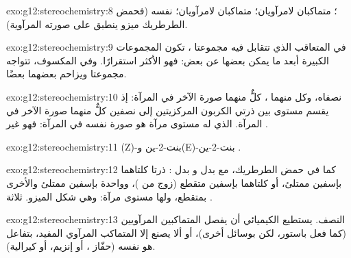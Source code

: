 \begin{solution}{exo:g12:stereochemistry:8}
؛ متماكبان لامرآويان؛ متماكبان لامرآويان؛  نفسه (فحمض الطرطريك
ميزو ينطبق على صورته المرآوية).
\end{solution}

\begin{solution}{exo:g12:stereochemistry:9}
في  المتعاقب الذي تتقابل فيه مجموعتا ، تكون المجموعات
الكبيرة أبعد ما يمكن بعضها عن بعض: فهو الأكثر استقرارًا. وفي
 المكسوف، تتواجه مجموعتا  ويزاحم بعضهما بعضًا.
\end{solution}

\begin{solution}{exo:g12:stereochemistry:10}
نصفاه، وكل منهما ، كلٌّ منهما صورة الآخر في المرآة: إذ يقسم
مستوى بين ذرتي الكربون المركزيتين  إلى نصفين كلٌّ منهما صورة
الآخر في المرآة.  الذي له مستوى مرآة هو صورة نفسه في المرآة: فهو غير
.
\end{solution}

\begin{solution}{exo:g12:stereochemistry:11}
(Z)-بنت-2-ين 
و(E)-بنت-2-ين .
\end{solution}

\begin{solution}{exo:g12:stereochemistry:12}
كما في حمض الطرطريك، مع  بدل  و
بدل : ذرتا  كلتاهما بإسفين ممتلئ، أو كلتاهما بإسفين متقطع (زوج من
)، وواحدة بإسفين ممتلئ والأخرى بمتقطع، ولها مستوى مرآة: وهي
شكل الميزو. ثلاثة .
\end{solution}

\begin{solution}{exo:g12:stereochemistry:13}
النصف. يستطيع الكيميائي أن يفصل المتماكبين المرآويين (كما فعل باستور، لكن
بوسائل أخرى)، أو ألا يصنع إلا المتماكب المرآوي المفيد، بتفاعل
هو نفسه  (حفّاز ، أو إنزيم، أو 
كيرالية).
\end{solution}

